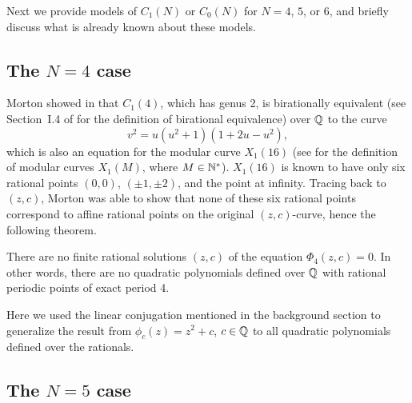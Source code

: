 Next we provide models of $C_1(N)$ or $C_0(N)$ for $N = 4$, $5$, or
$6$, and briefly discuss what is already known about these models.

\subsection{The $N = 4$ case}
\label{subsec:model-4}

Morton showed in \cite{MR1665198} that $C_1(4)$, which has genus 2, is
birationally equivalent (see Section~I.4 of \cite{MR0463157} for the
definition of birational equivalence) over $\mathbb{Q}$ to the curve
\begin{equation}
  \label{eq:c1(4)}
  v^2 = u(u^2 + 1)(1 + 2u - u^2),
\end{equation}
which is also an equation for the modular curve $X_1(16)$ (see
\cite{2013arXiv1308.3267B} for the definition of modular curves
$X_1(M)$, where $M \in \mathbb{N}^*$). $X_1(16)$ is known to have only six
rational points $(0, 0)$, $(\pm 1, \pm 2)$, and the point at
infinity. Tracing back to $(z, c)$, Morton was able to show that none
of these six rational points correspond to affine rational points on
the original $(z, c)$-curve, hence the following theorem.

\begin{theorem}
  There are no finite rational solutions $(z, c)$ of the equation
  $\Phi_4(z, c) = 0$. In other words, there are no quadratic
  polynomials defined over $\mathbb{Q}$ with rational periodic points of exact
  period 4.
\end{theorem}

\begin{remark}
  Here we used the linear conjugation mentioned in the background
  section to generalize the result from $\phi_c(z) = z^2 + c$, $c \in
  \mathbb{Q}$ to all quadratic polynomials defined over the rationals.
\end{remark}

\subsection{The $N = 5$ case}
\label{subsec:model-5}

